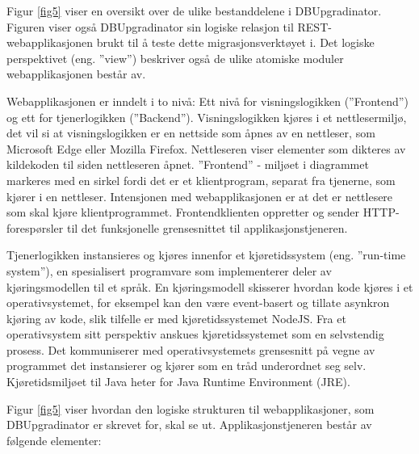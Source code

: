Figur \ref{fig5} viser en oversikt over de ulike bestanddelene i DBUpgradinator. Figuren viser også DBUpgradinator sin logiske relasjon til REST-webapplikasjonen brukt til å teste dette migrasjonsverktøyet i. Det logiske perspektivet (eng. ''view'') beskriver også de ulike atomiske moduler webapplikasjonen består av.

Webapplikasjonen er inndelt i to nivå: Ett nivå for visningslogikken (''Frontend'') og ett for tjenerlogikken (''Backend''). Visningslogikken kjøres i et nettlesermiljø, det vil si at visningslogikken er en nettside som åpnes av en nettleser, som Microsoft Edge eller Mozilla Firefox. Nettleseren viser elementer som dikteres av kildekoden til siden nettleseren åpnet. ''Frontend'' - miljøet i diagrammet markeres med en sirkel fordi det er et klientprogram, separat fra tjenerne, som kjører i en nettleser. Intensjonen med webapplikasjonen er at det er nettlesere som skal kjøre klientprogrammet. Frontendklienten oppretter og sender HTTP-forespørsler til det funksjonelle grensesnittet til applikasjonstjeneren.

Tjenerlogikken instansieres og kjøres innenfor et kjøretidssystem (eng. ''run-time system''), en spesialisert programvare som implementerer deler av kjøringsmodellen til et språk. En kjøringsmodell skisserer hvordan kode kjøres i et operativsystemet, for eksempel kan den være event-basert og tillate asynkron kjøring av kode, slik tilfelle er med kjøretidssystemet NodeJS. Fra et operativsystem sitt perspektiv anskues kjøretidssystemet som en selvstendig prosess. Det kommuniserer med operativsystemets grensesnitt på vegne av programmet det instansierer og kjører som en tråd underordnet seg selv. Kjøretidsmiljøet til Java heter for Java Runtime Environment (JRE).

Figur \ref{fig5} viser hvordan den logiske strukturen til webapplikasjoner, som DBUpgradinator er skrevet for, skal se ut. Applikasjonstjeneren består av følgende elementer:

